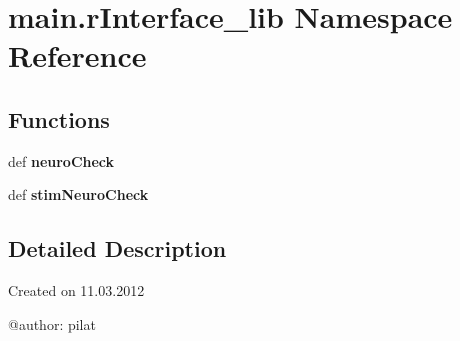 \hypertarget{namespacemain_1_1r_interface__lib}{\section{main.\-r\-Interface\-\_\-lib Namespace Reference}
\label{namespacemain_1_1r_interface__lib}
}
\subsection*{Functions}
\begin{DoxyCompactItemize}
\item 
\hypertarget{namespacemain_1_1r_interface__lib_a74f5606cb249b566bc7b233673947389}{def {\bfseries neuro\-Check}}\label{namespacemain_1_1r_interface__lib_a74f5606cb249b566bc7b233673947389}

\item 
\hypertarget{namespacemain_1_1r_interface__lib_aacd61d357806c2a1d35e078f4ab7307c}{def {\bfseries stim\-Neuro\-Check}}\label{namespacemain_1_1r_interface__lib_aacd61d357806c2a1d35e078f4ab7307c}

\end{DoxyCompactItemize}


\subsection{Detailed Description}
\begin{DoxyVerb}Created on 11.03.2012

@author: pilat
\end{DoxyVerb}
 